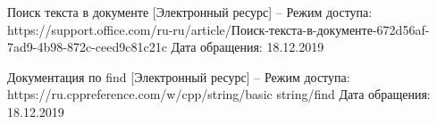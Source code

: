 \newpage
{}

\begin{thebibliography}{}
     Поиск текста в документе [Электронный ресурс] -- Режим доступа: https://support.office.com/ru-ru/article/Поиск-текста-в-документе-672d56af-7ad9-4b98-872c-ceed9c81c21c Дата обращения: 18.12.2019

     Документация по find [Электронный ресурс] -- Режим доступа: https://ru.cppreference.com/w/cpp/string/basic string/find Дата обращения: 18.12.2019
\end{thebibliography}
